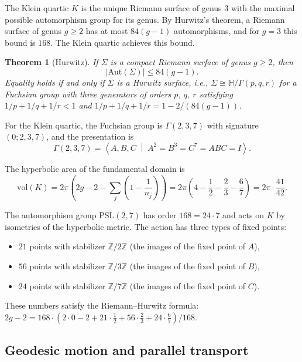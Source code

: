 \documentclass[12pt,a4paper]{article}
\newtheorem{theorem}{Theorem}[section]
\theoremstyle{definition}
\theoremstyle{remark}
\newcommand{\ZZ}{\mathbb{Z}}
\newcommand{\HH}{\mathbb{H}}
\newcommand{\PSL}{\mathrm{PSL}}
\newcommand{\Aut}{\mathrm{Aut}}
\begin{document}
The Klein quartic $K$ is the unique Riemann surface of genus $3$ with the maximal possible automorphism group for its genus. By Hurwitz's theorem, a Riemann surface of genus $g \geq 2$ has at most $84(g-1)$ automorphisms, and for $g = 3$ this bound is $168$. The Klein quartic achieves this bound.

\begin{theorem}[Hurwitz]
If $\Sigma$ is a compact Riemann surface of genus $g \geq 2$, then
\begin{equation}
|\Aut(\Sigma)| \leq 84(g - 1).
\end{equation}
Equality holds if and only if $\Sigma$ is a Hurwitz surface, i.e., $\Sigma \cong \HH/\Gamma(p, q, r)$ for a Fuchsian group with three generators of orders $p$, $q$, $r$ satisfying $1/p + 1/q + 1/r < 1$ and $1/p + 1/q + 1/r = 1 - 2/(84(g-1))$.
\end{theorem}

For the Klein quartic, the Fuchsian group is $\Gamma(2,3,7)$ with signature $(0; 2, 3, 7)$, and the presentation is
\begin{equation}
\Gamma(2,3,7) = \left\langle A, B, C \;\middle|\; A^2 = B^3 = C^7 = ABC = I \right\rangle.
\end{equation}

The hyperbolic area of the fundamental domain is
\begin{equation}
\mathrm{vol}(K) = 2\pi\left(2g - 2 - \sum_{j} \left(1 - \frac{1}{n_j}\right)\right) = 2\pi\left(4 - \frac{1}{2} - \frac{2}{3} - \frac{6}{7}\right) = 2\pi \cdot \frac{41}{42}.
\end{equation}

The automorphism group $\PSL(2,7)$ has order $168 = 24 \cdot 7$ and acts on $K$ by isometries of the hyperbolic metric. The action has three types of fixed points:
\begin{itemize}
\item $21$ points with stabilizer $\ZZ/2\ZZ$ (the images of the fixed point of $A$),
\item $56$ points with stabilizer $\ZZ/3\ZZ$ (the images of the fixed point of $B$),
\item $24$ points with stabilizer $\ZZ/7\ZZ$ (the images of the fixed point of $C$).
\end{itemize}
These numbers satisfy the Riemann--Hurwitz formula: $2g - 2 = 168 \cdot (2 \cdot 0 - 2 + 21 \cdot \frac{1}{2} + 56 \cdot \frac{2}{3} + 24 \cdot \frac{6}{7})/168$.

\subsection{Geodesic motion and parallel transport}
\end{document}
